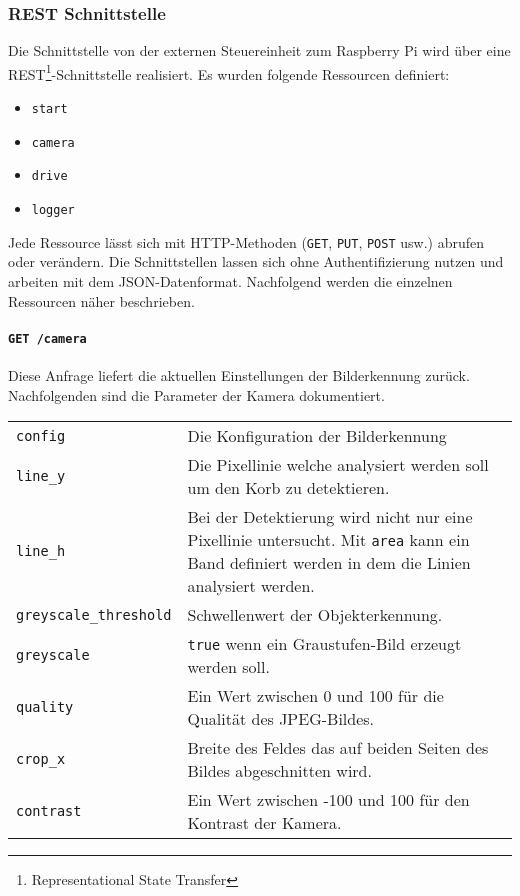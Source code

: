 \subsubsection{REST Schnittstelle}
\label{sec:rest-schnittstelle}

Die Schnittstelle von der externen Steuereinheit zum Raspberry Pi wird über eine REST\footnote{Representational State Transfer}-Schnittstelle realisiert. Es wurden folgende Ressourcen definiert:
\begin{itemize}
	\item \texttt{start}
	\item \texttt{camera}
	\item \texttt{drive}
	\item \texttt{logger}
\end{itemize}
Jede Ressource lässt sich mit HTTP-Methoden (\texttt{GET}, \texttt{PUT}, \texttt{POST} usw.) abrufen oder verändern. Die Schnittstellen lassen sich ohne Authentifizierung nutzen und arbeiten mit dem JSON-Datenformat. Nachfolgend werden die einzelnen Ressourcen näher beschrieben.

\paragraph{\texttt{GET /camera}}

Diese Anfrage liefert die aktuellen Einstellungen der Bilderkennung zurück. Nachfolgenden sind die Parameter der Kamera dokumentiert.
\label{tab:parameter-bilderkennung}
\begin{table}[h!]
	\begin{tabular}{l p{16cm}}
		\texttt{config} & Die Konfiguration der Bilderkennung \\
		\texttt{line\_y} & Die Pixellinie welche analysiert werden soll um den Korb zu detektieren. \\
		\texttt{line\_h} & Bei der Detektierung wird nicht nur eine Pixellinie untersucht. Mit \texttt{area} kann ein Band definiert werden in dem die Linien analysiert werden. \\
		\texttt{greyscale\_threshold} & Schwellenwert der Objekterkennung. \\
		\texttt{greyscale} & \texttt{true} wenn ein Graustufen-Bild erzeugt werden soll. \\
		\texttt{quality} & Ein Wert zwischen 0 und 100 für die Qualität des JPEG-Bildes. \\
		\texttt{crop\_x} & Breite des Feldes das auf beiden Seiten des Bildes abgeschnitten wird. \\
		\texttt{contrast} & Ein Wert zwischen -100 und 100 für den Kontrast der Kamera. \\
	\end{tabular}
	
\end{table}

